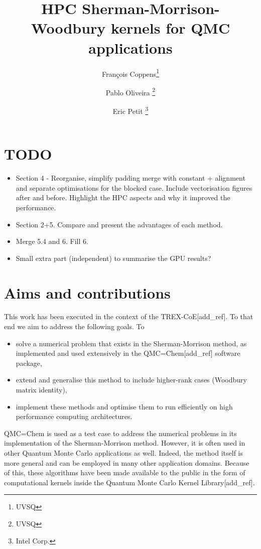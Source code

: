 \documentclass[11pt]{article}
\title{HPC Sherman-Morrison-Woodbury kernels for QMC applications}
\author{Fran\c{c}ois Coppens\thanks{UVSQ} \and Pablo Oliveira \thanks{UVSQ} \and Eric Petit \thanks{Intel Corp.}}
\numberwithin{figure}{section}
\numberwithin{table}{section}
\begin{document}
	\maketitle
	\tableofcontents
	
  \section*{TODO}
    \begin{itemize}           
      \item Section 4 - Reorganise, simplify padding merge with constant + alignment and separate optimisations for the blocked case. Include vectorisation figures after and before.
      Highlight the HPC aspects and why it improved the performance. 
      \item Section 2+5.   Compare and present the advantages of each method.
      \item Merge 5.4 and 6. Fill 6.
      \item Small extra part (independent) to summarise the GPU results?
    \end{itemize}
    
  \newpage
  \section{Aims and contributions}      
    This work has been executed in the context of the TREX-CoE[add\_ref]. To that end we aim to address the following goals. To
    \begin{itemize}
      \item solve a numerical problem that exists in the Sherman-Morrison method, as implemented and used extensively in the QMC=Chem[add\_ref] software package,
      \item extend and generalise this method to include higher-rank cases (Woodbury matrix identity),
      \item implement these methods and optimise them to run efficiently on high performance computing architectures.
    \end{itemize}
      
      QMC=Chem is used as a test case to address the numerical problems in its implementation of the Sherman-Morrison method. However, it is often used in other Quantum Monte Carlo applications as well. Indeed, the method itself is more general and can be employed in many other application domains. Because of this, these algorithms have been made available to the public in the form of computational kernels inside the Quantum Monte Carlo Kernel Library[add\_ref].\\
      
\end{document}
